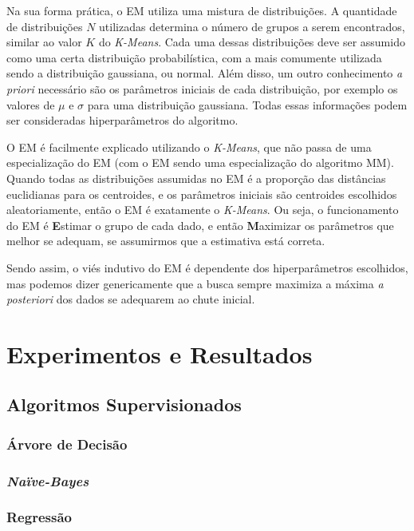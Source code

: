\documentclass{article}
\begin{document}
Na sua forma prática, o EM utiliza uma mistura de distribuições.
A quantidade de distribuições $N$ utilizadas determina o número de grupos
a serem encontrados, similar ao valor $K$ do {\it K-Means}.
Cada uma dessas distribuições deve ser assumido como uma
certa distribuição probabilística, com a mais comumente utilizada sendo a distribuição gaussiana, ou normal.
Além disso, um outro conhecimento {\it a priori} necessário
são os parâmetros iniciais de cada distribuição, por exemplo os valores de $\mu$ e $\sigma$
para uma distribuição gaussiana.
Todas essas informações podem ser consideradas hiperparâmetros do algoritmo.

O EM é facilmente explicado utilizando o {\it K-Means},
que não passa de uma especialização do EM
(com o EM sendo uma especialização do algoritmo MM).
Quando todas as distribuições assumidas no EM é a
proporção das distâncias euclidianas para os centroides,
e os parâmetros iniciais são centroides escolhidos aleatoriamente,
então o EM é exatamente o {\it K-Means}.
Ou seja, o funcionamento do EM é \textbf{E}stimar o grupo de cada dado,
e então \textbf{M}aximizar os parâmetros que melhor se adequam,
se assumirmos que a estimativa está correta.

Sendo assim, o viés indutivo do EM é dependente dos hiperparâmetros escolhidos,
mas podemos dizer genericamente que a busca sempre maximiza
a máxima {\it a posteriori} dos dados se adequarem ao chute inicial.

\section{Experimentos e Resultados}

\subsection{Algoritmos Supervisionados}

\subsubsection{Árvore de Decisão}

\subsubsection{{\b \it Naïve-Bayes}}

\subsubsection{Regressão}
\end{document}
